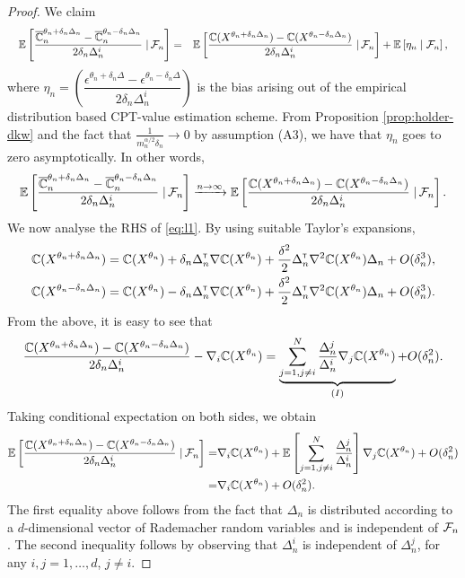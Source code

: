 \begin{proof}
We claim
\begin{align}
\quad\mathbb{E}\left[\dfrac{\overline {\mathbb{C}}_n^{\theta_n+\delta_n \Delta_n} -\overline {\mathbb{C}}_n^{\theta_n-\delta_n \Delta_n}}{2 \delta_n \Delta_n^{i}} \left.\right| \mathcal{F}_n\right] 
= \quad&\mathbb{E}\left[\dfrac{\mathbb{C}(X^{\theta_n + \delta_n \Delta_n}) - \mathbb{C}(X^{\theta_n - \delta_n \Delta_n})}{2 \delta_n \Delta_n^{i}} \left.\right| \mathcal{F}_n\right] + \mathbb{E}\left[ \eta_n \mid \mathcal{F}_n\right],
\end{align}
where $\eta_n = \left(\dfrac{\epsilon^{\theta_n +\delta_n\Delta} - \epsilon^{\theta_n-\delta_n\Delta}}{2\delta_n\Delta_n^{i}}\right)$
 is the bias arising out of the empirical distribution based CPT-value estimation scheme.
From Proposition \ref{prop:holder-dkw} and the fact that $\frac{1}{m_n^{\alpha/2} \delta_n} \rightarrow 0$ by assumption (A3), we have that
$\eta_n$ goes to zero asymptotically. In other words,
\begin{align}
\quad\mathbb{E}\left[\dfrac{\overline {\mathbb{C}}_n^{\theta_n+\delta_n \Delta_n} -\overline {\mathbb{C}}_n^{\theta_n-\delta_n \Delta_n}}{2 \delta_n \Delta_n^{i}} \left.\right| \mathcal{F}_n\right] 
&\xrightarrow{n\rightarrow\infty}  \mathbb{E}\left[\dfrac{\mathbb{C}(X^{\theta_n + \delta_n \Delta_n}) -\mathbb{C}(X^{\theta_n - \delta_n \Delta_n})}{2 \delta_n \Delta_n^{i}} \left.\right| \mathcal{F}_n\right].  \label{eq:l1}
\end{align}
We now analyse the RHS of \eqref{eq:l1}.
By using suitable Taylor's expansions,
\begin{align*}
\mathbb{C}(X^{\theta_n + \delta_n \Delta_n}) = \mathbb{C}(X^{\theta_n}) + \delta_n \Delta_n^\mathsf{\scriptscriptstyle T} \nabla \mathbb{C}(X^{\theta_n}) + \frac{\delta^2}{2} \Delta_n^\mathsf{\scriptscriptstyle T} \nabla^2 \mathbb{C}(X^{\theta_n})\Delta_n + O(\delta_n^3), \\
\mathbb{C}(X^{\theta_n - \delta_n \Delta_n}) = \mathbb{C}(X^{\theta_n}) - \delta_n \Delta_n^\mathsf{\scriptscriptstyle T} \nabla \mathbb{C}(X^{\theta_n}) + \frac{\delta^2}{2} \Delta_n^\mathsf{\scriptscriptstyle T} \nabla^2 \mathbb{C}(X^{\theta_n})\Delta_n + O(\delta_n^3).\end{align*}
From the above, it is easy to see that 
\begin{align*}
\dfrac{\mathbb{C}(X^{\theta_n + \delta_n \Delta_n}) - \mathbb{C}(X^{\theta_n - \delta_n \Delta_n})}{2 \delta_n \Delta_n^i}
- \nabla_i \mathbb{C}(X^{\theta_n})
=\underbrace{\sum_{j=1,j\not=i}^{N} \frac{\Delta_n^j}{\Delta_n^i}\nabla_j \mathbb{C}(X^{\theta_n})}_{(I)} + O(\delta_n^2).
\end{align*}
Taking conditional expectation on both sides, we obtain
\begin{align}
\mathbb{E}\left[\dfrac{\mathbb{C}(X^{\theta_n + \delta_n \Delta_n}) - \mathbb{C}(X^{\theta_n - \delta_n \Delta_n})}{2 \delta_n \Delta_n^i} \left.\right| \mathcal{F}_n\right] 
=& \nabla_i \mathbb{C}(X^{\theta_n}) + \mathbb{E}\left[\sum_{j=1,j\not=i}^{N} \frac{\Delta_n^j}{\Delta_n^i}\right]\nabla_j \mathbb{C}(X^{\theta_n}) + O(\delta_n^2)\nonumber\\
= & \nabla_i \mathbb{C}(X^{\theta_n}) + O(\delta_n^2).\label{eq:l2}
\end{align}
The first equality above follows from the fact that $\Delta_n$ is distributed according to a $d$-dimensional vector of Rademacher random variables and is independent of $\mathcal{F}_n$. The second inequality follows by observing that $\Delta_n^i$ is independent of $\Delta_n^j$, for any $i,j =1,\ldots,d$, $j\ne i$. 


\end{proof}
